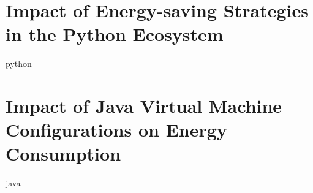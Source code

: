 \newpage
% 

\chapter{Impact of Energy-saving Strategies in the Python Ecosystem}
\label{chapter:python}
{python}

\chapter{Impact of Java Virtual Machine Configurations on Energy Consumption}
\label{chapter:java}
{java}